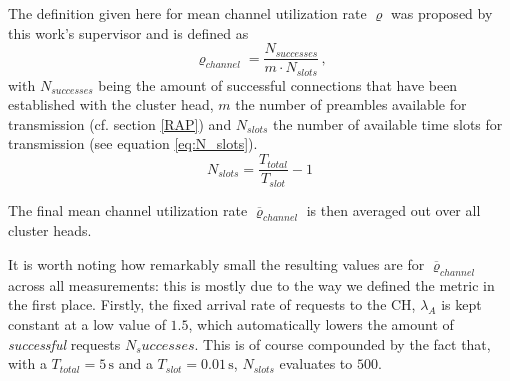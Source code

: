 The definition given here for mean channel utilization rate $\varrho$ was proposed by this work's supervisor and is defined as
\begin{equation}\label{eq:TP}
\varrho_{channel} = \frac{N_{successes}}{m\cdot N_{slots}}\,\text{,}
\end{equation}
with $N_{successes}$ being the amount of successful connections that have been established with the cluster head, $m$ the number of preambles available for transmission (cf. section \ref{RAP}) and $N_{slots}$ the number of available time slots for transmission (see equation \ref{eq:N_slots}).
\begin{equation}\label{eq:N_slots}
N_{slots} = \frac {T_{total}} {T_{slot}} -1
\end{equation}

The final mean channel utilization rate $\overline{\varrho}_{channel}$ is then averaged out over all cluster heads.

It is worth noting how remarkably small the resulting values are for $\overline{\varrho}_{channel}$ across all measurements: this is mostly due to the way we defined the metric in the first place. Firstly, the fixed arrival rate of requests to the CH, $\lambda_A$ is kept constant at a low value of $1.5$, which automatically lowers the amount of \textit{successful} requests $N_successes$. This is of course compounded by the fact that, with a $T_{total} = 5\,\text{s}$ and a $T_{slot} = 0.01\,\text{s}$, $N_{slots}$ evaluates to $500$. 

